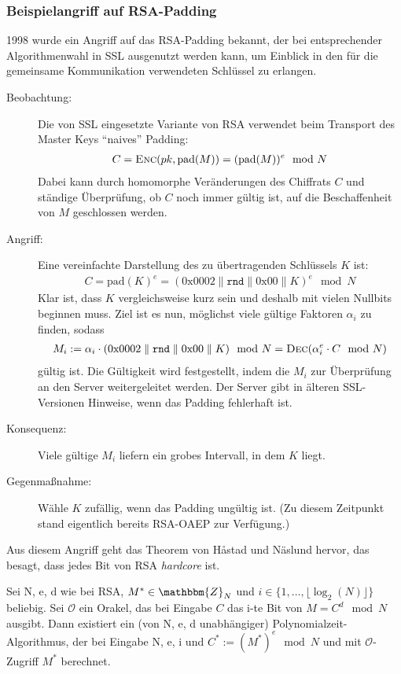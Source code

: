 \subsubsection{Beispielangriff auf RSA-Padding} 1998 wurde ein Angriff
auf das RSA-Padding bekannt, der bei entsprechender Algorithmenwahl in
SSL ausgenutzt werden kann, um Einblick in den für die gemeinsame
Kommunikation verwendeten Schlüssel zu erlangen.
\begin{description}
\item[Beobachtung:] Die von SSL eingesetzte Variante von RSA
  verwendet beim Transport des Master Keys \indexTLSMasterKey "`naives"'
  Padding:
  \begin{align*} C = \textsc{Enc}(pk, \text{pad}(M)) =
    (\text{pad}(M))^e \mod N
  \end{align*} Dabei kann durch homomorphe Veränderungen
  des Chiffrats $C$ und ständige Überprüfung, ob $C$ noch immer gültig
  ist, auf die Beschaffenheit von $M$ geschlossen werden.
\item[Angriff:] Eine vereinfachte Darstellung des zu
  übertragenden Schlüssels $K$ ist:
  \begin{align*} C = \text{pad}(K)^e =
    (0\mathrm{x}0002 \parallel \mathtt{rnd} \parallel
    0\mathrm{x}00 \parallel K)^e \mod N
  \end{align*} Klar ist, dass $K$ vergleichsweise kurz
  sein und deshalb mit vielen Nullbits beginnen muss. Ziel ist es nun,
  möglichst viele gültige Faktoren $\alpha_i$ zu finden, sodass
  \begin{align*} M_i := \alpha_i \cdot
    (0\mathrm{x}0002 \parallel \mathtt{rnd} \parallel
    0\mathrm{x}00 \parallel K) \mod N = \textsc{Dec}(\alpha_i^e \cdot C \mod N)
  \end{align*} gültig ist. Die Gültigkeit wird
  festgestellt, indem die $M_i$ zur Überprüfung an den Server
  weitergeleitet werden. Der Server gibt in älteren SSL-Versionen
  Hinweise, wenn das Padding fehlerhaft ist.
\item[Konsequenz:] Viele gültige $M_i$ liefern ein grobes
  Intervall, in dem $K$ liegt.
\item[Gegenmaßnahme:] Wähle $K$ zufällig, wenn das Padding
  ungültig ist. (Zu diesem Zeitpunkt stand eigentlich bereits RSA-OAEP zur
  Verfügung.)
\end{description} 
Aus diesem Angriff geht das Theorem von Håstad und Näslund hervor, das
besagt, dass jedes Bit von RSA \emph{hardcore} ist.
\begin{theorem} Sei N, e, d wie bei RSA, $M^* \in
\mathbbm{Z}_N$ und $i \in \{1, \ldots , \lfloor \log_2(N)\rfloor \}$
beliebig. Sei $\mathcal{O}$ ein Orakel, das bei Eingabe $C$ das i-te Bit
von $M = C^d \mod N$ ausgibt. Dann existiert ein (von N, e, d
unabhängiger) Polynomialzeit-Algorithmus, der bei Eingabe N, e, i und
$C^* := (M^*)^e \mod N$ und mit $\mathcal{O}$-Zugriff $M^*$ berechnet.
\end{theorem}


